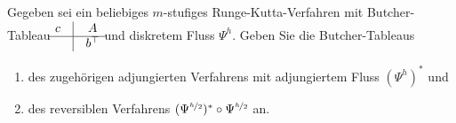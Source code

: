 \begin{exercise}
  Gegeben sei ein beliebiges $m$-stufiges Runge-Kutta-Verfahren mit Butcher-Tableau
  \renewcommand{\arraystretch}{1.2}
    $\begin{matrix}
    c & \vline & A \\
    \hline
     & \vline & b^{\top}
    \end{matrix}$
    und diskretem Fluss $\Psi^h$. Geben Sie die Butcher-Tableaus
    \begin{enumerate}[label = \textbf{\alph*)}]
      \item des zugehörigen adjungierten Verfahrens mit adjungiertem Fluss $(\Psi^h)^*$ und
      \item des reversiblen Verfahrens $(\Psi^{\nicefrac{h}{2}})^* \circ \Psi^{\nicefrac{h}{2}}$ an.
    \end{enumerate}
\end{exercise}

